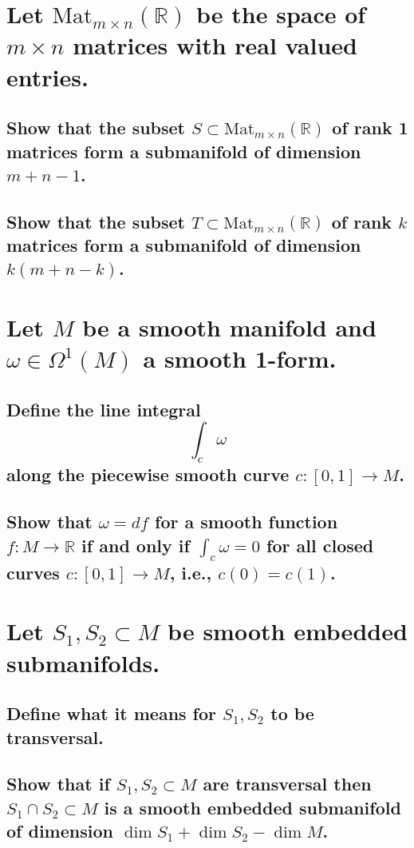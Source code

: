 \documentclass[10pt]{article}
\newcommand{\mat}[3]{\mathrm{Mat}_{#1 \times #2}(#3)} %
\begin{document}
 

\section{Let $\mat{ m}{n}{\mathbb{R}} $ be the space of $m \times n$ matrices with real
  valued entries.}

\subsection{Show that the subset $S \subset \mat{m}{n}{\mathbb{R}}$ of rank 1 matrices form a
  submanifold of dimension $m+n-1$.}

\subsection{Show that the subset $T \subset \mat{m}{n}{\mathbb{R}}$ of rank $k$ matrices form a
  submanifold of dimension $k(m+n-k)$.}

\section{Let $M$ be a smooth manifold and $\omega \in \Omega^1(M)$ a smooth 1-form.}

\subsection{Define the line integral
  $$\int_c \omega$$
  along the piecewise smooth curve $c: [0,1] \to M$.}

\subsection{Show that $\omega = df $ for a smooth function $f : M \to \mathbb{R}$ if and only if
  $\int_c \omega =0$ for all closed curves $c: [0,1] \to M$, i.e., $c(0) = c(1)$.}

\section{Let $S_1, S_2 \subset M$ be smooth embedded submanifolds.}

\subsection{Define what it means for $S_1, S_2$ to be transversal.}

\subsection{Show that if $S_1, S_2 \subset M$ are transversal then $S_1 \cap S_2 \subset M$ is a
  smooth embedded submanifold of dimension $\dim S_1 + \dim S_2 - \dim M$.}
\end{document}
